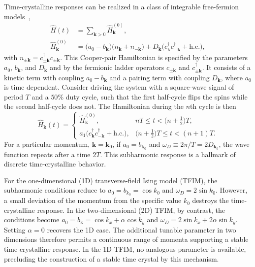 \documentclass[%
reprint,
superscriptaddress,
amsmath,amssymb,
aps,
prb,
showkeys,%
floatfix,
]{revtex4-2}
\newcommand{\bmk}{\bm{k}}
\let\cite\citep   %
\begin{document}
	Time-crystalline responses can be realized in a class of integrable free-fermion models~\cite{Chandra2024},
	\begin{equation}
		\begin{aligned}
			\hat{H}(t)&=\sum_{\bmk>0}\hat{H}_{\bmk}^{(0)},\\
			\hat{H}_{\bmk}^{(0)}&=\big(a_0-b_{\bmk}\big)\big(n_{\bmk}+n_{-\bmk}\big)
			+D_{\bmk}\big(c^{\dagger}_{\bmk}c^{\dagger}_{-\bmk}+\mathrm{h.c.}\big),
		\end{aligned}
		\label{eq:cooper}
	\end{equation}
	with $n_{\pm\bmk}=c^\dagger_{\pm\bmk}c_{\pm\bmk}$. This Cooper-pair Hamiltonian is specified by the parameters $a_{0}$, $b_{\bmk}$, and $D_{\bmk}$ and by the fermionic ladder operators $c_{\pm\bmk}$ and $c^{\dagger}_{\pm\bmk}$. It consists of a kinetic term with coupling $a_{0}-b_{\bmk}$ and a pairing term with coupling $D_{\bmk}$, where $a_{0}$ is time dependent. Consider driving the system with a square-wave signal of period $T$ and a $50\%$ duty cycle, such that the first half-cycle flips the spins while the second half-cycle does not. The Hamiltonian during the $n$th cycle is then
	\begin{equation}
		\hat{H}_{\bmk}(t)=
		\begin{cases}
			\hat{H}_{\bmk}^{(0)}, & nT\le t<\big(n+\tfrac12\big)T,\\[2pt]
			a_1\big(c^{\dagger}_{\bmk}c^{\dagger}_{-\bmk}+\mathrm{h.c.}\big), & \big(n+\tfrac12\big)T\le t<(n+1)T .
		\end{cases}
		\label{eq:ff_drive}
	\end{equation}
	For a particular momentum, $\bmk=\bmk_0$, if $a_{0}=b_{\bmk_0}$ and $\omega_D\equiv 2\pi/T=2D_{\bmk_0}$, the wave function repeats after a time $2T$. This subharmonic response is a hallmark of discrete time-crystalline behavior.
	
	For the one-dimensional (1D) transverse-field Ising model (TFIM), the subharmonic conditions reduce to $a_{0}=b_{k_0}=\cos k_0$ and $\omega_D=2\sin k_0$. However, a small deviation of the momentum from the specific value $k_0$ destroys the time-crystalline response. In the two-dimensional (2D) TFIM, by contrast, the conditions become $a_{0}=b_{\bmk}=\cos k_x+\alpha\cos k_y$ and $\omega_D=2\sin k_x+2\alpha\sin k_y$. Setting $\alpha=0$ recovers the 1D case. The additional tunable parameter in two dimensions therefore permits a continuous range of momenta supporting a stable time crystalline response. In the 1D TFIM, no analogous parameter is available, precluding the construction of a stable time crystal by this mechanism.
	
\end{document}

